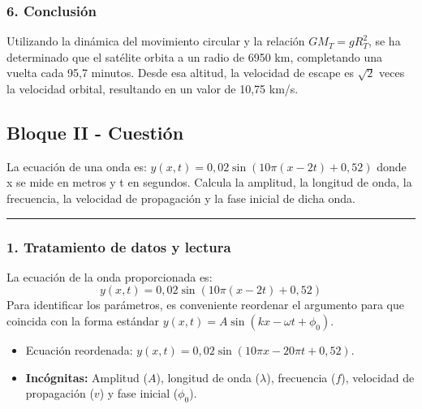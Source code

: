 \subsubsection*{6. Conclusión}
\begin{cajaconclusion}
Utilizando la dinámica del movimiento circular y la relación $GM_T=gR_T^2$, se ha determinado que el satélite orbita a un radio de 6950 km, completando una vuelta cada 95,7 minutos. Desde esa altitud, la velocidad de escape es $\sqrt{2}$ veces la velocidad orbital, resultando en un valor de 10,75 km/s.
\end{cajaconclusion}

\newpage

\subsection{Bloque II - Cuestión}
\label{subsec:B2_2010_sep_ext}

\begin{cajaenunciado}
La ecuación de una onda es: $y(x,t)=0,02 \sin(10\pi(x-2t)+0,52)$ donde x se mide en metros y t en segundos. Calcula la amplitud, la longitud de onda, la frecuencia, la velocidad de propagación y la fase inicial de dicha onda.
\end{cajaenunciado}
\hrule

\subsubsection*{1. Tratamiento de datos y lectura}
La ecuación de la onda proporcionada es:
$$ y(x,t) = 0,02 \sin(10\pi(x-2t)+0,52) $$
Para identificar los parámetros, es conveniente reordenar el argumento para que coincida con la forma estándar $y(x,t) = A \sin(kx - \omega t + \phi_0)$.
\begin{itemize}
    \item Ecuación reordenada: $y(x,t) = 0,02 \sin(10\pi x - 20\pi t + 0,52)$.
    \item \textbf{Incógnitas:} Amplitud ($A$), longitud de onda ($\lambda$), frecuencia ($f$), velocidad de propagación ($v$) y fase inicial ($\phi_0$).
\end{itemize}

